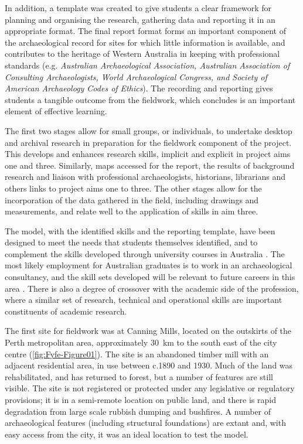 \documentclass{ijsra}
\begin{document}
In addition, a template was created to give students a clear framework for planning and organising the research, gathering data and reporting it in an appropriate format. 
The final report format forms an important component of the archaeological record for sites for which little information is available, and contributes to the heritage of Western Australia in keeping with professional standards (e.g. \emph{Australian Archaeological Association, Australian Association of Consulting Archaeologists, World Archaeological Congress, and Society of American Archaeology Codes of Ethics}). 
The recording and reporting gives students a tangible outcome from the fieldwork, which \textcite[113-116]{mytum2012c} concludes is an important element of effective learning.

The first two stages allow for small groups, or individuals, to undertake desktop and archival research in preparation for the fieldwork component of the project. 
This develops and enhances research skills, implicit and explicit in project aims one and three. Similarly, maps accessed for the report, the results of background research and liaison with professional archaeologists, historians, librarians and others links to project aims one to three. 
The other stages allow for the incorporation of the data gathered in the field, including drawings and measurements, and relate well to the application of skills in aim three.

The model, with the identified skills and the reporting template, have been designed to meet the needs that students themselves identified, and to complement the skills developed through university courses in Australia \parencite[3]{beck2008}. 
The most likely employment for Australian graduates is to work in an archaeological consultancy, and the skill sets developed will be relevant to future careers in this area \parencites[e.g.][]{ireland2013}{ulm2005}{ulm2013}. 
There is also a degree of crossover with the academic side of the profession, where a similar set of research, technical and operational skills are important constituents of academic research.


The first site for fieldwork was at Canning Mills, located on the outskirts of the Perth metropolitan area, approximately \SI {30}{\kilo\meter} 
to the south east of the city centre (\cref{fig:Fyfe-Figure01}). 
The site is an abandoned timber mill with an adjacent residential area, in use between c.1890 and 1930. 
Much of the land was rehabilitated, and has returned to forest, but a number of features are still visible. The site is not registered or protected under any legislative or regulatory provisions; it is in a semi-remote location on public land, and there is rapid degradation from large scale rubbish dumping and bushfires. A number of archaeological features (including structural foundations) are extant and, with easy access from the city, it was an ideal location to test the model.
\end{document}
